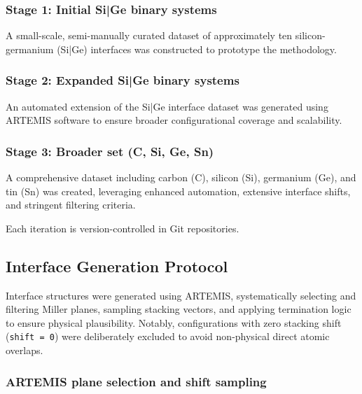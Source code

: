 \subsubsection{Stage 1: Initial Si|Ge binary systems}

A small-scale, semi-manually curated dataset of approximately ten silicon-germanium (Si|Ge) interfaces was constructed
to prototype the methodology.

\subsubsection{Stage 2: Expanded Si|Ge binary systems}

An automated extension of the Si|Ge interface dataset was generated using ARTEMIS software to ensure broader
configurational coverage and scalability.

\subsubsection{Stage 3: Broader set (C, Si, Ge, Sn)}

A comprehensive dataset including carbon (C), silicon (Si), germanium (Ge), and tin (Sn) was created, leveraging
enhanced automation, extensive interface shifts, and stringent filtering criteria.

Each iteration is version-controlled in Git repositories.


\subsection{Interface Generation Protocol}

Interface structures were generated using ARTEMIS, systematically selecting and filtering Miller planes, sampling
stacking vectors, and applying termination logic to ensure physical plausibility. Notably, configurations with zero
stacking shift (\texttt{shift = 0}) were deliberately excluded to avoid non-physical direct atomic overlaps.

\subsubsection{ARTEMIS plane selection and shift sampling}



